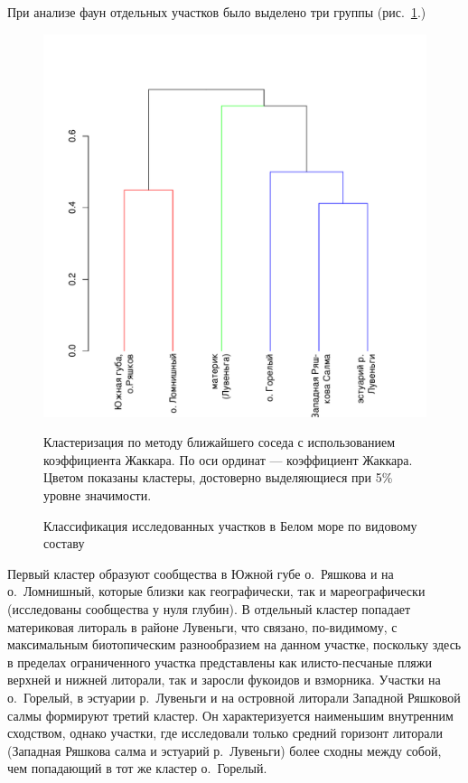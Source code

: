 При анализе фаун отдельных участков было выделено три группы (рис.~\ref{ris:cluster_white_species_sites}.) 
	\begin{figure}[p]
		\begin{center}
			\includegraphics{../White_Sea/soobshestvo/White_fauna_sites_jaccard_single_1.pdf}
		\end{center}
	\caption{Классификация исследованных участков в Белом море по видовому составу}
	\label{ris:cluster_white_species_sites}

	\footnotesize{Кластеризация по методу ближайшего соседа с использованием коэффициента Жаккара. По оси ординат --- коэффициент Жаккара. Цветом показаны кластеры, достоверно выделяющиеся при 5\% уровне значимости.}
	\end{figure}
Первый кластер образуют сообщества в  Южной губе о.~Ряшкова и на о.~Ломнишный, которые близки как географически, так и мареографически (исследованы сообщества у нуля глубин).
В отдельный кластер попадает материковая литораль в районе Лувеньги, что связано, по-видимому, с максимальным биотопическим разнообразием на данном участке, поскольку здесь в пределах ограниченного участка представлены как илисто-песчаные пляжи верхней и нижней литорали, так и заросли фукоидов и взморника.
Участки на о.~Горелый, в эстуарии р.~Лувеньги и на островной литорали Западной Ряшковой салмы формируют третий кластер.
Он характеризуется наименьшим внутренним сходством, однако участки, где исследовали только средний горизонт литорали (Западная Ряшкова салма и эстуарий р.~Лувеньги) более сходны между собой, чем попадающий в тот же кластер о.~Горелый.

